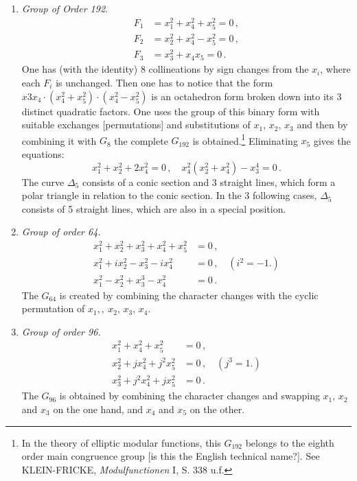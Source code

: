 \documentclass[leqno]{article}
\begin{document}
\begin{enumerate}[label=\arabic*)]
	\item \textit{Group of Order 192}.
	\begin{align*}
		F_1 &= x_1^2 + x_4^2 + x_5^2 = 0 \, , \\
		F_2 &= x_2^2 + x_4^2 - x_5^2 = 0 \, , \\
		F_3 &= x_3^2 + x_4 x_5 = 0 \, . 
	\end{align*}
    One has (with the identity) 8 collineations by sign changes from the $x_i$, where each $F_i$ is unchanged. Then one has to notice that the form $x3 x_4 \cdot (x_4^2 + x_5^2) \cdot (x_4^2 - x_5^2)$ is an octahedron form broken down into its 3 distinct quadratic factors. One uses the group of this binary form with suitable exchanges [permutations] and substitutions of $x_1, \, x_2, \, x_3$ and then by combining it with $G_8$ the complete $G_{192}$ is obtained.\footnote{In the theory of elliptic modular functions, this $G_{192}$ belongs to the eighth order main congruence group [is this the English technical name?]. See KLEIN-FRICKE, \textit{Modulfunctionen} I, S. 338 u.f.} Eliminating $x_5$ gives the equations:
    \[
    x_1^2 + x_2^2 + 2x_4^2 = 0 \, , \quad x_4^2(x_2^2 + x_4^2) - x_3^4 = 0 \, . 
    \]
    The curve $\Delta_5$ consists of a conic section and 3 straight lines, which form a polar triangle in relation to the conic section. In the 3 following cases, $\Delta_5$ consists of 5 straight lines, which are also in a special position.
    \item \textit{Group of order 64.}
    \begin{align*}
    	x_1^2 + x_2^2 + x_3^2 + x_4^2 + x_5^2 &= 0 \, , \\
    	x_1^2 + i x_2^2 - x_3^2 - i x_4^2 &= 0 \, , \quad (i^2=-1.) \\
    	x_1^2 - x_2^2 + x_3^3 - x_4^2 &= 0 \, . 
    \end{align*}
    The $G_{64}$ is created by combining the character changes with the cyclic permutation of $x_1, ,\ x_2, \, x_3, \, x_4.$
    \item \textit{Group of order 96.}
    \begin{align*}
    	x_1^2 + x_4^2 + x_5^2 &= 0 \, , \\
    	x_2^2 + j x_4^2 + j^2 x_5^2 &= 0 \, , \quad (j^3=1.) \\
    	x_3^2 + j^2 x_4^2 + j x_5^2 &= 0 \, . 
    \end{align*}
    The $G_{96}$ is obtained by combining the character changes and swapping $x_1, \, x_2$ and $x_3$ on the one hand, and $x_4$ and $x_5$ on the other.

\end{enumerate}
\end{document}
